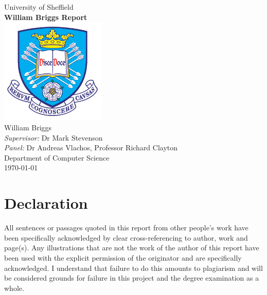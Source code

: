 \documentclass[11pt,oneside]{book}
\begin{document}
\begin{titlepage}


\begin{center}
{\LARGE University of Sheffield}\\[1.5cm]
\linespread{1.2}\huge {\bfseries William Briggs Report}\\[1.5cm]
\linespread{1}
\includegraphics[width=5cm]{images/tuoslogo.png}\\[1cm]
{\Large William Briggs}\\[1cm]
{\large \emph{Supervisor:} Dr Mark Stevenson}\\[1cm]
{\large \emph{Panel:} Dr Andreas Vlachos, Professor Richard Clayton}\\[1cm]
Department of Computer Science\\[2cm]
\today
\end{center}

\end{titlepage}


\newpage
\chapter*{\Large Declaration}


All sentences or passages quoted in this report from other people's work have been specifically acknowledged by clear cross-referencing to author, work and page(s). Any illustrations that are not the work of the author of this report have been used with the explicit permission of the originator and are specifically acknowledged. I understand that failure to do this amounts to plagiarism and will be considered grounds for failure in this project and the degree examination as a whole.\\[1cm]
\end{document}
